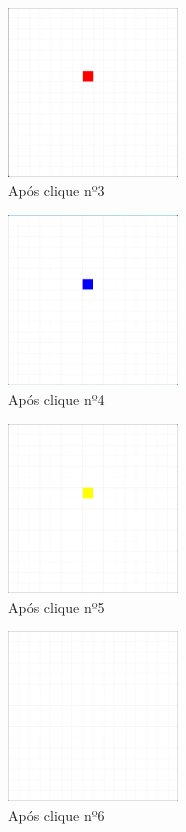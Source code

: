 \documentclass[
	12pt,				%
	oneside,			%
	a4paper,			%
	english,			%
	brazil,				%
	]{abntex2}
\begin{document}
{\begin{figure}[H]
\includegraphics[width=0.4\textwidth]{imgs/img4.png}
\caption{Após clique nº3}
\label{Após clique nº3}
\end{figure}
\begin{figure}[H]
\centering
\includegraphics[width=0.4\textwidth]{imgs/img5.png}
\caption{Após clique nº4}
\label{Após clique nº4}
\end{figure}
\begin{figure}[H]
\centering
\includegraphics[width=0.4\textwidth]{imgs/img6.png}
\caption{Após clique nº5}
\label{Após clique nº5}
\end{figure}
\begin{figure}[H]
\centering
\includegraphics[width=0.4\textwidth]{imgs/img7.png}
\caption{Após clique nº6}
\label{Após clique nº6}
\end{figure}

}
\end{document}
